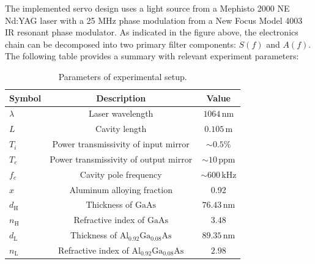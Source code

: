 
The implemented servo design uses a light source from a Mephisto 2000 NE Nd:YAG laser with a 25 MHz phase modulation from a New Focus Model 4003 IR resonant phase modulator. As indicated in the figure above, the electronics chain can be decomposed into two primary filter components: $S(f)$ and $A(f)$. The following table provides a summary with relevant experiment parameters:

\begin{table}[h!]
\caption{Parameters of experimental setup.}
\centering 
\begin{tabular}{lcc}
    \hline \hline
    Symbol & Description & Value \\
    \hline
    $\lambda$ & Laser wavelength & $1064 \, \mathrm{nm}$ \\
    $L$ & Cavity length & $0.105\, \mathrm{m}$ \\
    $T_i$ & Power transmissivity of input mirror & $\sim0.5\%$ \\
    $T_e$ & Power transmissivity of output mirror & $\sim10\, \mathrm{ppm}$ \\
    $f_c$ & Cavity pole frequency & $\sim600\, \mathrm{kHz}$ \\
    $x$ & Aluminum alloying fraction & 0.92 \\
    $d_{\mathrm{H}}$ & Thickness of $\mathrm{GaAs}$ & $76.43\, \mathrm{nm}$ \\
    $n_{\mathrm{H}}$ & Refractive index of $\mathrm{GaAs}$ & $3.48$ \\
    $d_{\mathrm{L}}$ & Thickness of $\mathrm{Al_{0.92}Ga_{0.08}As}$ & $89.35\, \mathrm{nm}$ \\
    $n_{\mathrm{L}}$ & Refractive index of $\mathrm{Al_{0.92}Ga_{0.08}As}$ & $2.98$ \\
    \hline \hline
\end{tabular}
\end{table}

